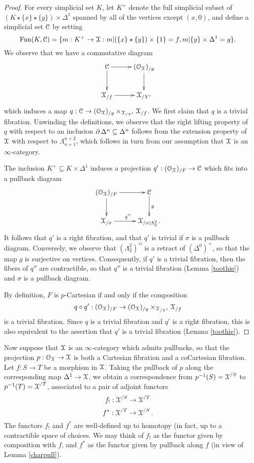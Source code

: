 \begin{proof}
For every simplicial set $K$, let $K^{+}$ denote the full simplicial subset
of $(K \star \{x\} \star \{y\}) \times \Delta^1$ spanned by all of the vertices except
$(x,0)$, and define a simplicial set $\operatorname{\mathcal{C}}$ by setting 
$$\operatorname{Fun}(K, \operatorname{\mathcal{C}}) = \{ m: K^{+} \rightarrow \operatorname{\mathcal{X}} : m| (\{x\} \star \{y\}) \times \{1\} = f,
m| \{y\} \times \Delta^1 = g \}.$$
We observe that we have a commutative diagram
$$ \xymatrix{ \calC \ar[r] \ar[d] & (\calO_{\calX})_{/g} \ar[d] \\
\calX_{/f} \ar[r] & \calX_{/Y'} }$$
which induces a map $q: \operatorname{\mathcal{C}} \rightarrow (\operatorname{\mathcal{O}}_{\operatorname{\mathcal{X}}})_{/g} \times_{ \operatorname{\mathcal{X}}_{/Y'} } \operatorname{\mathcal{X}}_{/f}$.
We first claim that $q$ is a trivial fibration. Unwinding the definitions, we observe that the right lifting property of $q$ with respect to an inclusion $\operatorname{\partial} \Delta^n \subseteq \Delta^n$ follows from the extension property of $\operatorname{\mathcal{X}}$ with respect to $\Lambda^{n+2}_{n+1}$, which follows in turn from our assumption that $\operatorname{\mathcal{X}}$ is an $\infty$-category.

The inclusion $K^{+} \subseteq K \times \Delta^1$ induces a projection $q': ( \operatorname{\mathcal{O}}_{\operatorname{\mathcal{X}}})_{/F} \rightarrow \operatorname{\mathcal{C}}$ which fits into a pullback diagram
$$ \xymatrix{ ( \calO_{\calX})_{/F} \ar[r] \ar[d] & \calC \ar[d]^{g} \\
\calX_{/ \sigma } \ar[r]^{q''} & \calX_{/ \sigma | \Lambda^2_2}. }$$
It follows that $q'$ is a right fibration, and that $q'$ is trivial if $\sigma$ is a pullback
diagram. Conversely, we observe that $( \Lambda^2_2)^{\triangleleft}$ is a retract of
$(\Delta^{0})^{+}$, so that the map $g$ is surjective on vertices. Consequently, if
$q'$ is a trivial fibration, then the fibers of $q''$ are contractible, so that $q''$ is a trivial fibration
(Lemma \ref{toothie}) and $\sigma$ is a pullback diagram.

By definition, $F$ is $p$-Cartesian if and only if the composition
$$q \circ q': (\operatorname{\mathcal{O}}_{\operatorname{\mathcal{X}}})_{/F} \rightarrow (\operatorname{\mathcal{O}}_{\operatorname{\mathcal{X}}})_{/g} \times_{ \operatorname{\mathcal{X}}_{/Y'} } \operatorname{\mathcal{X}}_{/f}$$
is a trivial fibration. Since $q$ is a trivial fibration and $q'$ is a right fibration, this is also equivalent to the assertion that $q'$ is a trivial fibration (Lemma \ref{toothie}).
\end{proof}

Now suppose that $\operatorname{\mathcal{X}}$ is an $\infty$-category which admits pullbacks, so that the projection
$p: \operatorname{\mathcal{O}}_{\operatorname{\mathcal{X}}} \rightarrow \operatorname{\mathcal{X}}$ is both a Cartesian fibration and a coCartesian fibration.
Let $f: S \rightarrow T$ be a morphism in $\operatorname{\mathcal{X}}$. Taking the pullback of $p$ along
the corresponding map $\Delta^1 \rightarrow \operatorname{\mathcal{X}}$, we obtain a correspondence from
$p^{-1}(S) = \operatorname{\mathcal{X}}^{/S}$ to $p^{-1}(T) = \operatorname{\mathcal{X}}^{/T}$, associated to a pair of adjoint functors
$$ f_{!}: \operatorname{\mathcal{X}}^{/S} \rightarrow \operatorname{\mathcal{X}}^{/T}$$
$$ f^{\ast}: \operatorname{\mathcal{X}}^{/T} \rightarrow \operatorname{\mathcal{X}}^{/S}.$$
The functors $f_{!}$ and $f^{\ast}$ are well-defined up to homotopy (in fact, up to a contractible space of choices. We may think of $f_{!}$ as the functor given by composition with $f$, and $f^{\ast}$ as the functor given by pullback along $f$ (in view of Lemma \ref{charpull}). 

